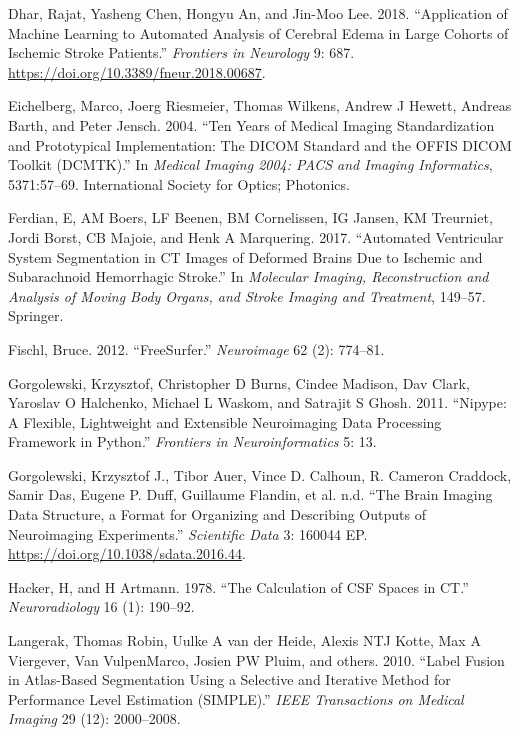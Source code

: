 \documentclass[]{elsarticle} %
\begin{document}
\leavevmode\hypertarget{ref-csfedema}{}%
Dhar, Rajat, Yasheng Chen, Hongyu An, and Jin-Moo Lee. 2018. ``Application of Machine Learning to Automated Analysis of Cerebral Edema in Large Cohorts of Ischemic Stroke Patients.'' \emph{Frontiers in Neurology} 9: 687. \url{https://doi.org/10.3389/fneur.2018.00687}.

\leavevmode\hypertarget{ref-dcmtk}{}%
Eichelberg, Marco, Joerg Riesmeier, Thomas Wilkens, Andrew J Hewett, Andreas Barth, and Peter Jensch. 2004. ``Ten Years of Medical Imaging Standardization and Prototypical Implementation: The DICOM Standard and the OFFIS DICOM Toolkit (DCMTK).'' In \emph{Medical Imaging 2004: PACS and Imaging Informatics}, 5371:57--69. International Society for Optics; Photonics.

\leavevmode\hypertarget{ref-ferdian2017automated}{}%
Ferdian, E, AM Boers, LF Beenen, BM Cornelissen, IG Jansen, KM Treurniet, Jordi Borst, CB Majoie, and Henk A Marquering. 2017. ``Automated Ventricular System Segmentation in CT Images of Deformed Brains Due to Ischemic and Subarachnoid Hemorrhagic Stroke.'' In \emph{Molecular Imaging, Reconstruction and Analysis of Moving Body Organs, and Stroke Imaging and Treatment}, 149--57. Springer.

\leavevmode\hypertarget{ref-freesurfer}{}%
Fischl, Bruce. 2012. ``FreeSurfer.'' \emph{Neuroimage} 62 (2): 774--81.

\leavevmode\hypertarget{ref-nipype}{}%
Gorgolewski, Krzysztof, Christopher D Burns, Cindee Madison, Dav Clark, Yaroslav O Halchenko, Michael L Waskom, and Satrajit S Ghosh. 2011. ``Nipype: A Flexible, Lightweight and Extensible Neuroimaging Data Processing Framework in Python.'' \emph{Frontiers in Neuroinformatics} 5: 13.

\leavevmode\hypertarget{ref-bids}{}%
Gorgolewski, Krzysztof J., Tibor Auer, Vince D. Calhoun, R. Cameron Craddock, Samir Das, Eugene P. Duff, Guillaume Flandin, et al. n.d. ``The Brain Imaging Data Structure, a Format for Organizing and Describing Outputs of Neuroimaging Experiments.'' \emph{Scientific Data} 3: 160044 EP. \url{https://doi.org/10.1038/sdata.2016.44}.

\leavevmode\hypertarget{ref-oldcsf}{}%
Hacker, H, and H Artmann. 1978. ``The Calculation of CSF Spaces in CT.'' \emph{Neuroradiology} 16 (1): 190--92.

\leavevmode\hypertarget{ref-langerak2010label}{}%
Langerak, Thomas Robin, Uulke A van der Heide, Alexis NTJ Kotte, Max A Viergever, Van VulpenMarco, Josien PW Pluim, and others. 2010. ``Label Fusion in Atlas-Based Segmentation Using a Selective and Iterative Method for Performance Level Estimation (SIMPLE).'' \emph{IEEE Transactions on Medical Imaging} 29 (12): 2000--2008.
\end{document}

